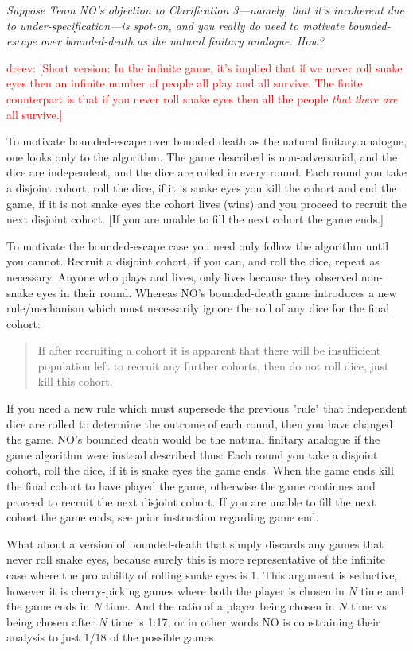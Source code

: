 \documentclass[article,twocolumn]{memoir}
\newcommand{\dreev} [1]{\ifnum\Chatty=1 \textcolor{red} {dreev:  [#1]} \fi}
\begin{document}
\emph{Suppose Team NO's objection to Clarification 3---namely, that it's incoherent due to under-specification---is spot-on, and you really do need to motivate bounded-escape over bounded-death as the natural finitary analogue. How?}

\vspace{1em}

\dreev{Short version:
In the infinite game, it's implied that if we never roll snake eyes then an infinite number of people all play and all survive.
The finite counterpart is that if you never roll snake eyes then all the people \emph{that there are} all survive.}

To motivate bounded-escape over bounded death as the natural finitary analogue, one looks only to the algorithm.
The game described is non-adversarial, and the dice are independent, and the dice are rolled in every round.
Each round you take a disjoint cohort, roll the dice, if it is snake eyes you kill the cohort and end the game, if it is not snake eyes the cohort lives (wins) and you proceed to recruit the next disjoint cohort.
[If you are unable to fill the next cohort the game ends.]

To motivate the bounded-escape case you need only follow the algorithm until you cannot. 
Recruit a disjoint cohort, if you can, and roll the dice, repeat as necessary.
Anyone who plays and lives, only lives because they observed non-snake eyes in their round.
Whereas NO's bounded-death game introduces a new rule/mechanism which must necessarily ignore the roll of any dice for the final cohort:
\begin{quote}
If after recruiting a cohort it is apparent that there will be insufficient population left to recruit any further cohorts, then do not roll dice, just kill this cohort.
\end{quote}
If you need a new rule which must supersede the previous "rule" that independent dice are rolled to determine the outcome of each round, then you have changed the game.
NO's bounded death would be the natural finitary analogue if the game algorithm were instead described thus: 
Each round you take a disjoint cohort, roll the dice, if it is snake eyes the game ends.
When the game ends kill the final cohort to have played the game, otherwise the game continues and proceed to recruit the next disjoint cohort.
If you are unable to fill the next cohort the game ends, see prior instruction regarding game end.

What about a version of bounded-death that simply discards any games that never roll snake eyes, because surely this is more representative of the infinite case where the probability of rolling snake eyes is 1.
This argument is seductive, however it is cherry-picking games where both the player is chosen in $N$ time and the game ends in $N$ time.
And the ratio of a player being chosen in $N$ time vs being chosen after $N$ time is 1:17, or in other words NO is constraining their analysis to just $1/18$ of the possible games.
\end{document}
